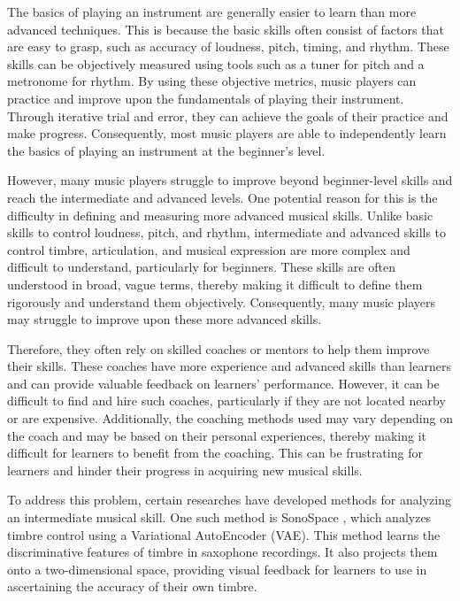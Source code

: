 \documentclass[manuscript,review,anonymous]{acmart}
\begin{document}
The basics of playing an instrument are generally easier to learn than more advanced techniques.
This is because the basic skills often consist of factors that are easy to grasp, such as accuracy of loudness, pitch, timing, and rhythm. 
These skills can be objectively measured using tools such as a tuner for pitch and a metronome for rhythm. 
By using these objective metrics, music players can practice and improve upon the fundamentals of playing their instrument. 
Through iterative trial and error, they can achieve the goals of their practice and make progress. 
Consequently, most music players are able to independently learn the basics of playing an instrument at the beginner's level.

However, many music players struggle to improve beyond beginner-level skills and reach the intermediate and advanced levels. 
One potential reason for this is the difficulty in defining and measuring more advanced musical skills. 
Unlike basic skills to control loudness, pitch, and rhythm, intermediate and advanced skills to control timbre, articulation, and musical expression are more complex and difficult to understand, particularly for beginners. 
These skills are often understood in broad, vague terms, thereby making it difficult to define them rigorously and understand them objectively. 
Consequently, many music players may struggle to improve upon these more advanced skills.

Therefore, they often rely on skilled coaches or mentors to help them improve their skills. 
These coaches have more experience and advanced skills than learners and can provide valuable feedback on learners' performance. 
However, it can be difficult to find and hire such coaches, particularly if they are not located nearby or are expensive. 
Additionally, the coaching methods used may vary depending on the coach and may be based on their personal experiences, thereby making it difficult for learners to benefit from the coaching. 
This can be frustrating for learners and hinder their progress in acquiring new musical skills.

To address this problem, certain researches have developed methods for analyzing an intermediate musical skill. One such method is SonoSpace \cite{SonoSpace}, which analyzes timbre control using a Variational AutoEncoder (VAE).
This method learns the discriminative features of timbre in saxophone recordings. 
It also projects them onto a two-dimensional space, providing visual feedback for learners to use in ascertaining the accuracy of their own timbre.
\end{document}
